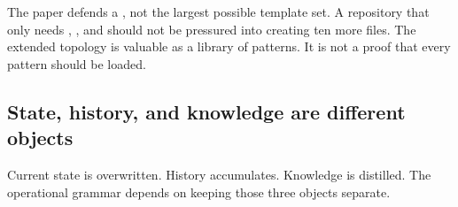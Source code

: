 The paper defends a , not the largest possible template set. A repository that only needs , , and  should not be pressured into creating ten more files. The extended topology is valuable as a library of patterns. It is not a proof that every pattern should be loaded.



\subsection{State, history, and knowledge are different objects}

Current state is overwritten. History accumulates. Knowledge is distilled. The operational grammar depends on keeping those three objects separate.


